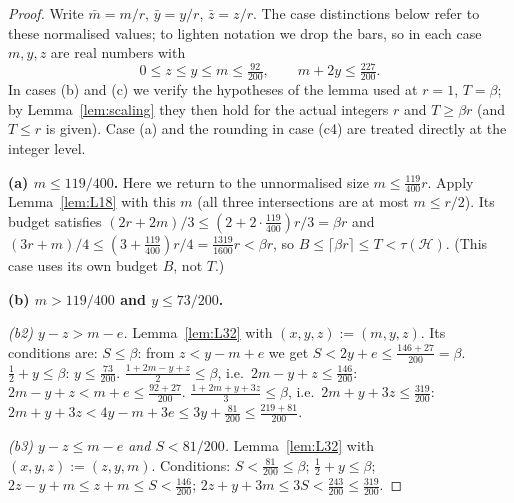 \documentclass[11pt]{amsart}
\theoremstyle{definition}
\theoremstyle{remark}
\newcommand{\cH}{\mathcal H}
\newcommand{\ceil}[1]{\lceil #1\rceil}
\begin{document}
\begin{proof}
Write $\bar m=m/r$, $\bar y=y/r$, $\bar z=z/r$. The case distinctions below refer to these normalised values; to lighten notation we drop the bars, so in each case $m,y,z$ are real numbers with
\[
0\le z\le y\le m\le\tfrac{92}{200},\qquad m+2y\le\tfrac{227}{200}. \tag{R}
\]
In cases (b) and (c) we verify the hypotheses of the lemma used at $r=1$, $T=\beta$; by Lemma~\ref{lem:scaling} they then hold for the actual integers $r$ and $T\ge\beta r$ (and $T\le r$ is given). Case (a) and the rounding in case (c4) are treated directly at the integer level.

\medskip\noindent\textbf{(a) $m\le119/400$.} Here we return to the unnormalised size $m\le\tfrac{119}{400}r$. Apply Lemma~\ref{lem:L18} with this $m$ (all three intersections are at most $m\le r/2$). Its budget satisfies $(2r+2m)/3\le(2+2\cdot\tfrac{119}{400})r/3=\beta r$ and $(3r+m)/4\le(3+\tfrac{119}{400})r/4=\tfrac{1319}{1600}r<\beta r$, so $B\le\ceil{\beta r}\le T<\tau(\cH)$. (This case uses its own budget $B$, not $T$.)

\medskip\noindent\textbf{(b) $m>119/400$ and $y\le73/200$.}

\emph{(b2) $y-z>m-e$.} Lemma~\ref{lem:L32} with $(x,y,z):=(m,y,z)$. Its conditions are: $S\le\beta$: from $z<y-m+e$ we get $S<2y+e\le\tfrac{146+27}{200}=\beta$. $\tfrac12+y\le\beta$: $y\le\tfrac{73}{200}$. $\tfrac{1+2m-y+z}{2}\le\beta$, i.e.\ $2m-y+z\le\tfrac{146}{200}$: $2m-y+z<m+e\le\tfrac{92+27}{200}$. $\tfrac{1+2m+y+3z}{3}\le\beta$, i.e.\ $2m+y+3z\le\tfrac{319}{200}$: $2m+y+3z<4y-m+3e\le3y+\tfrac{81}{200}\le\tfrac{219+81}{200}$.

\emph{(b3) $y-z\le m-e$ and $S<81/200$.} Lemma~\ref{lem:L32} with $(x,y,z):=(z,y,m)$. Conditions: $S<\tfrac{81}{200}\le\beta$; $\tfrac12+y\le\beta$; $2z-y+m\le z+m\le S<\tfrac{146}{200}$; $2z+y+3m\le3S<\tfrac{243}{200}\le\tfrac{319}{200}$.


\end{proof}
\end{document}
